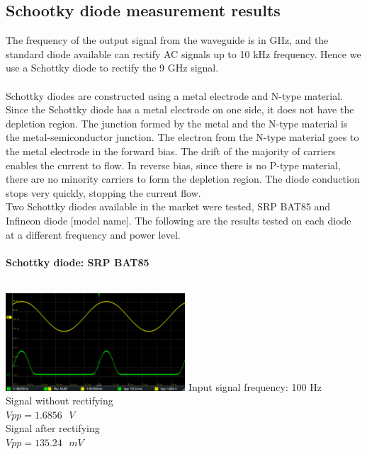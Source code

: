 \documentclass[12pt,a4paper,bold]{thesis}
\theoremstyle{thm}
\theoremstyle{definition}
\begin{document}
\subsection{Schootky diode measurement results}
The frequency of the output signal from the waveguide is in GHz, and the standard diode available can rectify AC signals up to 10 kHz frequency. Hence we use a Schottky diode to rectify the 9 GHz signal. 
\\\\
Schottky diodes are constructed using a metal electrode and N-type material. Since the Schottky diode has a metal electrode on one side, it does not have the depletion region. The junction formed by the metal and the N-type material is the metal-semiconductor junction. The electron from the N-type material goes to the metal electrode in the forward bias. The drift of the majority of carriers enables the current to flow. In reverse bias, since there is no P-type material, there are no minority carriers to form the depletion region. The diode conduction stops very quickly, stopping the current flow.
\\
Two Schottky diodes available in the market were tested, SRP BAT85 and Infineon diode [model name]. The following are the results tested on each diode at a different frequency and power level. \\\\
\textbf{Schottky diode: SRP BAT85 }\\\\
\begin{minipage}[b]{0.48\linewidth}
\includegraphics[width=6.7cm]{Images/Amazon/LF100Hz.png}  
Input signal frequency: 100 Hz\\
Signal without rectifying\\
$Vpp = 1.6856\text{ }V$\\
Signal after rectifying\\
$Vpp = 135.24\text{ }mV$\\
\end{minipage}
\hfill
\end{document}
